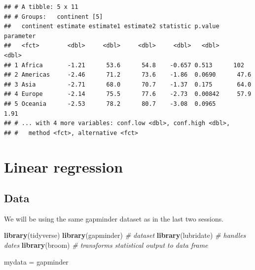 \documentclass[]{book}
\makeatletter
\newenvironment{Shaded}{\begin{snugshade}}{\end{snugshade}}
\newcommand{\KeywordTok}[1]{\textcolor[rgb]{0.13,0.29,0.53}{\textbf{#1}}}
\newcommand{\DataTypeTok}[1]{\textcolor[rgb]{0.13,0.29,0.53}{#1}}
\newcommand{\DecValTok}[1]{\textcolor[rgb]{0.00,0.00,0.81}{#1}}
\newcommand{\StringTok}[1]{\textcolor[rgb]{0.31,0.60,0.02}{#1}}
\newcommand{\CommentTok}[1]{\textcolor[rgb]{0.56,0.35,0.01}{\textit{#1}}}
\newcommand{\OperatorTok}[1]{\textcolor[rgb]{0.81,0.36,0.00}{\textbf{#1}}}
\newcommand{\NormalTok}[1]{#1}
\newenvironment{kframe}{%
\medskip{}
\setlength{\fboxsep}{.8em}
 \def\at@end@of@kframe{}%
 \ifinner\ifhmode%
  \def\at@end@of@kframe{\end{minipage}}%
  \begin{minipage}{\columnwidth}%
 \fi\fi%
 \def\FrameCommand##1{\hskip\@totalleftmargin \hskip-\fboxsep
 \colorbox{shadecolor}{##1}\hskip-\fboxsep
     \hskip-\linewidth \hskip-\@totalleftmargin \hskip\columnwidth}%
 \MakeFramed {\advance\hsize-\width
   \@totalleftmargin\z@ \linewidth\hsize
   \@setminipage}}%
 {\par\unskip\endMakeFramed%
 \at@end@of@kframe}
\renewenvironment{Shaded}{\begin{kframe}}{\end{kframe}}
\makeatother
\begin{document}
\begin{Shaded}
\end{Shaded}

\begin{verbatim}
## # A tibble: 5 x 11
## # Groups:   continent [5]
##   continent estimate estimate1 estimate2 statistic p.value parameter
##   <fct>        <dbl>     <dbl>     <dbl>     <dbl>   <dbl>     <dbl>
## 1 Africa       -1.21      53.6      54.8    -0.657 0.513      102   
## 2 Americas     -2.46      71.2      73.6    -1.86  0.0690      47.6 
## 3 Asia         -2.71      68.0      70.7    -1.37  0.175       64.0 
## 4 Europe       -2.14      75.5      77.6    -2.73  0.00842     57.9 
## 5 Oceania      -2.53      78.2      80.7    -3.08  0.0965       1.91
## # ... with 4 more variables: conf.low <dbl>, conf.high <dbl>,
## #   method <fct>, alternative <fct>
\end{verbatim}

\chapter{Linear regression}\label{linear-regression}

\section{Data}\label{data-3}

We will be using the same gapminder dataset as in the last two sessions.

\begin{Shaded}
\begin{Highlighting}[]
\KeywordTok{library}\NormalTok{(tidyverse)}
\KeywordTok{library}\NormalTok{(gapminder) }\CommentTok{# dataset}
\KeywordTok{library}\NormalTok{(lubridate) }\CommentTok{# handles dates}
\KeywordTok{library}\NormalTok{(broom)     }\CommentTok{# transforms statistical output to data frame}

\NormalTok{mydata =}\StringTok{ }\NormalTok{gapminder}
\end{Highlighting}
\end{Shaded}
\end{document}
